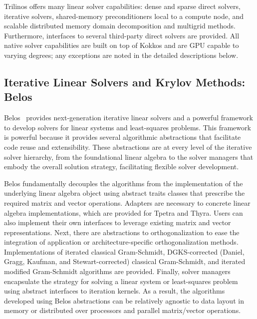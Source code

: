 
Trilinos offers many linear solver capabilities: dense and sparse direct solvers, iterative solvers, shared-memory preconditioners local to a compute node, and scalable distributed memory domain decomposition and multigrid methods. Furthermore, interfaces to several third-party direct solvers are provided. All native solver capabilities are built on top of Kokkos and are GPU capable to varying degrees; any exceptions are noted in the detailed descriptions below.




\subsection{Iterative Linear Solvers and Krylov Methods: Belos}

Belos~\cite{Bavier2012a} provides next-generation iterative linear solvers and a powerful
framework to develop solvers for linear systems and least-squares problems. This
framework is powerful because it provides several algorithmic abstractions
that facilitate code reuse and extensibility. These abstractions are at every level
of the iterative solver hierarchy, from the foundational linear algebra to the solver managers
that embody the overall solution strategy, facilitating flexible solver development.

Belos fundamentally decouples the algorithms from the implementation of the underlying linear algebra object using abstract traits classes that prescribe the required matrix and vector operations. Adapters are necessary to concrete linear algebra implementations, which are provided for Tpetra and Thyra. Users can also implement their own interfaces to leverage existing matrix and vector representations. Next, there are abstractions to orthogonalization to ease the integration of application or architecture-specific orthogonalization methods. Implementations of iterated classical Gram-Schmidt, DGKS-corrected (Daniel, Gragg, Kaufman, and Stewart-corrected) classical Gram-Schmidt, and iterated modified Gram-Schmidt algorithms are provided.  Finally, solver managers encapsulate the strategy for solving a linear system or least-squares problem using abstract interfaces to iteration kernels.  As a result, the algorithms developed using Belos abstractions can be relatively agnostic to data layout in memory or distributed over processors and parallel matrix/vector operations.

